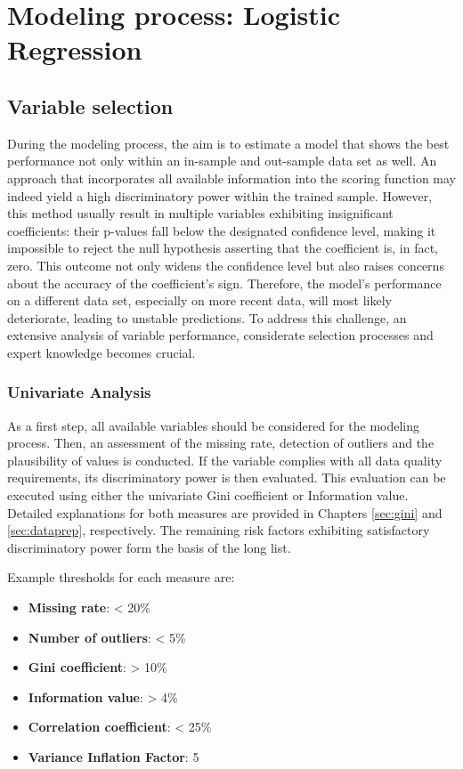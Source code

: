\section{Modeling process: Logistic Regression}

\subsection{Variable selection}
During the modeling process, the aim is to estimate a model that shows the best performance not only within an in-sample and out-sample data set as well. An approach that incorporates all available information into the scoring function may indeed yield a high discriminatory power within the trained sample. However, this method usually result in multiple variables exhibiting insignificant coefficients: their p-values fall below the designated confidence level, making it impossible to reject the null hypothesis asserting that the coefficient is, in fact, zero. This outcome not only widens the confidence level but also raises concerns about the accuracy of the coefficient's sign. Therefore, the model's performance on a different data set, especially on more recent data, will most likely deteriorate, leading to unstable predictions. To address this challenge, an extensive analysis of variable performance, considerate selection processes and expert knowledge becomes crucial. \cite[p.~44]{Witzany:2017}

\subsubsection{Univariate Analysis}
As a first step, all available variables should be considered for the modeling process. Then, an assessment of the missing rate, detection of outliers and the plausibility of values is conducted. If the variable complies with all data quality requirements, its discriminatory power is then evaluated. This evaluation can be executed using either the univariate Gini coefficient or Information value. Detailed explanations for both measures are provided in Chapters \ref{sec:gini} and \ref{sec:dataprep}, respectively. The remaining risk factors exhibiting satisfactory discriminatory power form the basis of the long list. \cite[p.~45]{Witzany:2017}

Example thresholds for each measure are:
\begin{itemize}
	\item \textbf{Missing rate}: < 20\%
	\item \textbf{Number of outliers}: < 5\%
	\item \textbf{Gini coefficient}: > 10\%
 	\item \textbf{Information value}: > 4\%
	\item \textbf{Correlation coefficient}: < 25\%
	\item \textbf{Variance Inflation Factor}: 5
\end{itemize}

